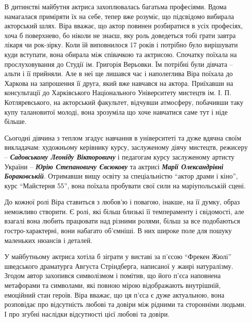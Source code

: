 
В дитинстві майбутня актриса захоплювалась багатьма професіями. Вдома
намагалася приміряти їх на себе, тепер вже розуміє, що підсвідомо вибирала
акторський шлях. Віра вважає, що актор повинен розбиратися в усіх професіях,
хоча б поверхнево, бо ніколи не знаєш, яку роль доведеться тобі грати завтра
лікаря чи рок-зірку. Коли їй виповнилося 17 років і потрібно було вирішувати
куди вступати, вона обирала між співачкою та актрисою. Спочатку поїхала на
прослуховування до Студії ім.  Григорія Верьовки. Їм потрібні були дівчата –
альти і її прийняли. Але в неї ще лишався час і наполеглива Віра поїхала до
Харкова на запрошення її друга, який вже навчався на актора. Приїхавши на
консультації до Харківського Національного Університету мистецтв ім. І. П.
Котляревського, на акторський факультет, відчувши атмосферу, побачивши таку
купу талановитої молоді, вона зрозуміла що хоче навчатися саме тут і ніде
більше.


Сьогодні дівчина з теплом згадує навчання в університеті та дуже вдячна своїм
викладачам: художньому керівнику курсу, заслуженому діячу мистецтв, режисеру –
\emph{\textbf{Садовському Леоніду Вікторовичу}} і педагогам курсу заслуженому артисту України –
\emph{\textbf{Юрію Степановичу Євсюкову}} та актрисі \emph{\textbf{Марії Олександрівні Бораковській}}.
Отримавши вищу освіту за спеціальністю \enquote{актор драми і кіно}, курс \enquote{Майстерня
55}, вона поїхала пробувати свої сили на маріупольській сцені.

До кожної ролі Віра ставиться з любов'ю і повагою, інакше, на її думку, образ
неможливо створити. Є ролі, які більш близькі її темпераменту і свідомості, але
взагалі вона любить працювати над різними ролями, більш за все подобаються
гостро-характерні, вони набагато об'ємніші. В них широке поле для пошуку
маленьких нюансів і деталей.

У майбутньому актриса хотіла б зіграти у виставі за п'єсою \enquote{Фрекен Жюлі}
шведського драматурга Августа Стріндберга, написаної у жанрі натуралізму.
Згодом автор захопився символізмом і помітив, що його п'єса наповнена
метафорами та символами, які повною мірою відображають внутрішній, емоційний
стан героїв. Віра вважає, що ця п'єса є дуже актуальною, вона розповідає про
відсутність любові та довіри між рідними та сторонніми людьми. І про згубні
наслідки відсутності цієї любові та довіри.

